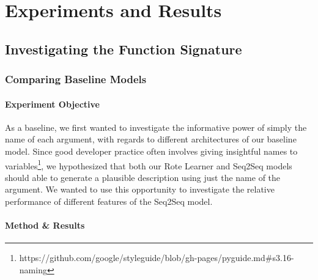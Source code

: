 \chapter{Experiments and Results}
\label{experiments_and_results}

\section{Investigating the Function Signature} %
\label{sec:investigating_function_sig}

\subsection{Comparing Baseline Models} %
\label{sub:comparing_baseline_models}





\subsubsection{Experiment Objective} %

As a baseline, we first wanted to investigate the informative power of simply the name of each argument, with regards to different architectures of our baseline model.
Since good developer practice often involves giving insightful names to variables\footnote{https://github.com/google/styleguide/blob/gh-pages/pyguide.md\#s3.16-naming}, we hypothesized that
 both our Rote Learner and Seq2Seq models should able to generate a plausible description using just the name of the argument.
We wanted to use this opportunity to investigate the relative performance of different features of the Seq2Seq model.

\subsubsection{Method \& Results} %

